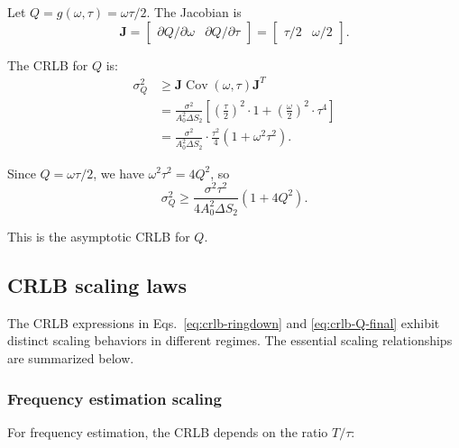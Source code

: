 \documentclass[11pt]{article}
\begin{document}
Let $Q = g(\omega, \tau) = \omega \tau / 2$. The Jacobian is
\[
\mathbf{J} = \begin{bmatrix}
\partial Q/\partial\omega & \partial Q/\partial\tau
\end{bmatrix}
= \begin{bmatrix}
\tau/2 & \omega/2
\end{bmatrix}.
\]

The CRLB for $Q$ is:
\begin{align}
\sigma_Q^2 &\ge \mathbf{J} \operatorname{Cov}(\omega,\tau) \mathbf{J}^T \nonumber \\
&= \frac{\sigma^2}{A_0^2 \Delta S_2}
\left[
\left(\frac{\tau}{2}\right)^2 \cdot 1 + \left(\frac{\omega}{2}\right)^2 \cdot \tau^4
\right] \nonumber \\
&= \frac{\sigma^2}{A_0^2 \Delta S_2} \cdot \frac{\tau^2}{4} \left( 1 + \omega^2 \tau^2 \right).
\end{align}

Since $Q = \omega \tau / 2$, we have $\omega^2 \tau^2 = 4Q^2$, so
\begin{equation}
\sigma_Q^2 \ge \frac{\sigma^2 \tau^2}{4 A_0^2 \Delta S_2} \left( 1 + 4Q^2 \right).
\label{eq:crlb-Q-final}
\end{equation}

This is the asymptotic CRLB for $Q$.

\subsection{CRLB scaling laws}
\label{sec:crlb-scaling}

The CRLB expressions in Eqs.~\eqref{eq:crlb-ringdown} and \eqref{eq:crlb-Q-final} exhibit distinct scaling behaviors in different regimes. The essential scaling relationships are summarized below.

\subsubsection{Frequency estimation scaling}

For frequency estimation, the CRLB depends on the ratio $T/\tau$:
\end{document}
